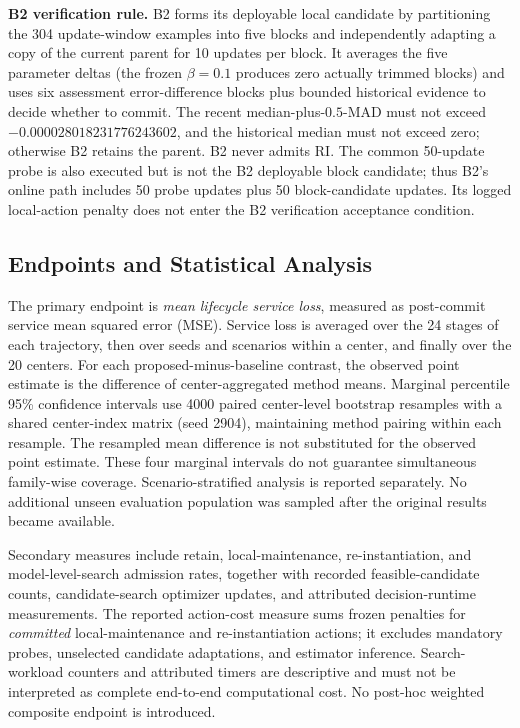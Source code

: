 \documentclass[journal]{IEEEtran}
\begin{document}
\noindent\textbf{B2 verification rule.} B2 forms its deployable local candidate by partitioning the 304 update-window examples into five blocks and independently adapting a copy of the current parent for 10 updates per block. It averages the five parameter deltas (the frozen $\beta=0.1$ produces zero actually trimmed blocks) and uses six assessment error-difference blocks plus bounded historical evidence to decide whether to commit. The recent median-plus-$0.5$-MAD must not exceed $-0.000028018231776243602$, and the historical median must not exceed zero; otherwise B2 retains the parent. B2 never admits RI. The common 50-update probe is also executed but is not the B2 deployable block candidate; thus B2's online path includes 50 probe updates plus 50 block-candidate updates. Its logged local-action penalty does not enter the B2 verification acceptance condition.


\subsection{Endpoints and Statistical Analysis}
The primary endpoint is \emph{mean lifecycle service loss}, measured
as post-commit service mean squared error (MSE). Service loss is
averaged over the 24 stages of each trajectory, then over seeds and
scenarios within a center, and finally over the 20 centers.
For each proposed-minus-baseline contrast, the observed point estimate
is the difference of center-aggregated method means.
Marginal percentile 95\% confidence intervals use 4000 paired
center-level bootstrap resamples with a shared center-index matrix
(seed 2904), maintaining method pairing within each resample.
The resampled mean difference is not substituted for the observed
point estimate. These four marginal intervals do not guarantee
simultaneous family-wise coverage. Scenario-stratified analysis is
reported separately. No additional unseen evaluation population
was sampled after the original results became available.

Secondary measures include retain, local-maintenance,
re-instantiation, and model-level-search admission rates, together
with recorded feasible-candidate counts, candidate-search optimizer
updates, and attributed decision-runtime measurements. The reported
action-cost measure sums frozen penalties for \emph{committed}
local-maintenance and re-instantiation actions; it excludes mandatory
probes, unselected candidate adaptations, and estimator inference.
Search-workload counters and attributed timers are descriptive and
must not be interpreted as complete end-to-end computational cost.
No post-hoc weighted composite endpoint is introduced.
\end{document}
